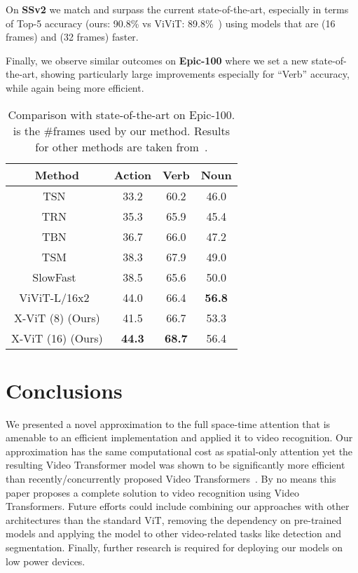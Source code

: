 \documentclass{article}
\begin{document}
On \textbf{SSv2} we match and surpass the current state-of-the-art, especially in terms of Top-5 accuracy (ours: 90.8\% vs ViViT: 89.8\%~\citep{arnab2021vivit}) using models that are  (16 frames) and  (32 frames) faster.

Finally, we observe similar outcomes on \textbf{Epic-100} where we set a new state-of-the-art, showing particularly large improvements especially for ``Verb'' accuracy, while again being more efficient.


\begin{wraptable}[15]{r}{7cm}
\vspace{-0.5cm}
\centering
\caption{Comparison with state-of-the-art on Epic-100.  is the \#frames used by our method. Results for other methods are taken from~\citep{arnab2021vivit}.}\label{tab:sota-epic}
    \begin{tabular}{cccc}
        \toprule
      Method &  Action & Verb & Noun  \\
      \midrule
      TSN~\citep{wang2016temporal} & 33.2 & 60.2 & 46.0 \\
      TRN~\citep{zhou2018temporal} & 35.3 & 65.9 & 45.4 \\
      TBN~\citep{kazakos2019epic} & 36.7 & 66.0 & 47.2 \\
      TSM~\citep{kazakos2019epic} & 38.3 & 67.9 & 49.0 \\
      SlowFast~\citep{feichtenhofer2019slowfast} & 38.5 & 65.6 & 50.0  \\
      ViViT-L/16x2~\citep{arnab2021vivit} & 44.0 & 66.4 & \textbf{56.8} \\
      \midrule
      X-ViT (8) (Ours) & 41.5 & 66.7 & 53.3  \\
      X-ViT (16) (Ours) & \textbf{44.3} & \textbf{68.7} & 56.4 \\
        \bottomrule
    \end{tabular}
\end{wraptable}

\section{Conclusions}\label{sec:conclusions}

We presented a novel approximation to the full space-time attention that is amenable to an efficient implementation and applied it to video recognition. Our approximation has the same computational cost as spatial-only attention yet the resulting Video Transformer model was shown to be significantly more efficient than recently/concurrently proposed Video Transformers~\cite{bertasius2021space,arnab2021vivit}. By no means this paper proposes a complete solution to video recognition using Video Transformers. Future efforts could include combining our approaches with other architectures than the standard ViT, removing the dependency on pre-trained models and applying the model to other video-related tasks like detection and segmentation. Finally, further research is required for deploying our models on low power devices.



\medskip

{
\small


}
\end{document}
